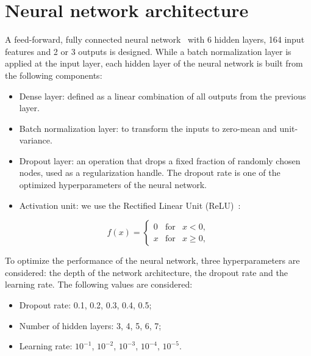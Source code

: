 \section{Neural network architecture}
\label{sec:dnn}

\par A feed-forward, fully connected neural network~\cite{hopfield1982neural} with 6 hidden layers, 164 input features and 2 or 3 outputs is designed. While a batch normalization layer is applied at the input layer, each hidden layer of the neural network is built from the following components:

\begin{itemize}
    \item Dense layer: defined as a linear combination of all outputs from the previous layer.
    \item Batch normalization layer: to transform the inputs to zero-mean and unit-variance. ~\cite{DBLP:journals/corr/IoffeS15}
    \item Dropout layer: an operation that drops a fixed fraction of randomly chosen nodes, used as a regularization handle. The dropout rate is one of the optimized hyperparameters of the neural network.~\cite{JMLR:v15:srivastava14a}
    \item Activation unit: we use the Rectified Linear Unit (ReLU)~\cite{inproceedings}:	
\end{itemize}

\begin{equation}
    f(x) = \left \{ \begin{array}{rcl}0 & \mbox{for} & x < 0,\\ x & \mbox{for} & x \ge 0,\end{array} \right. \label{eq:relu}
\end{equation}

\par To optimize the performance of the neural network, three hyperparameters are considered: the depth of the network architecture, the dropout rate and the learning rate. The following values are considered:

\begin{itemize}
    \item Dropout rate: 0.1, 0.2, 0.3, 0.4, 0.5;
    \item Number of hidden layers: 3, 4, 5, 6, 7;
    \item Learning rate: $10^{−1}$, $10^{−2}$, $10^{−3}$, $10^{−4}$, $10^{−5}$.
\end{itemize}

